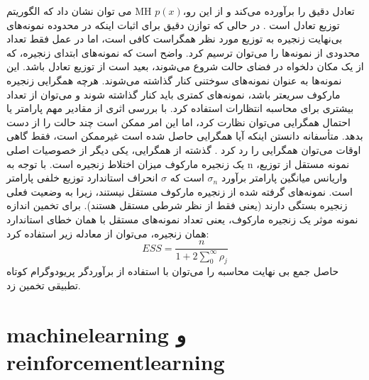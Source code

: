 می توان نشان داد که الگوریتم MH تعادل دقیق را برآورده می‌کند و از این رو،$p(x)$ توزیع تعادل است \cite{bishop2006pattern}. در حالی که توازن دقیق برای اثبات اینکه در محدوده نمونه‌های بی‌نهایت زنجیره به توزیع مورد نظر همگراست کافی است، اما در عمل فقط تعداد محدودی از نمونه‌ها را می‌توان ترسیم کرد. واضح است که نمونه‌های ابتدای زنجیره، که از یک مکان دلخواه در فضای حالت شروع می‌شوند، بعید است از توزیع تعادل باشد. این نمونه‌ها به عنوان نمونه‌های سوختنی کنار گذاشته می‌شوند. هرچه همگرایی زنجیره مارکوف سریعتر باشد، نمونه‌های کمتری باید کنار گذاشته شوند و می‌توان از تعداد بیشتری برای محاسبه انتظارات استفاده کرد. با بررسی اثری از مقادیر مهم پارامتر یا احتمال همگرایی می‌توان نظارت کرد، اما این امر ممکن است چند حالت را از دست بدهد. متأسفانه دانستن اینکه آیا همگرایی حاصل شده است غیرممکن است، فقط گاهی اوقات می‌توان همگرایی را رد کرد \cite{gelman2011inference}. گذشته از همگرایی، یکی دیگر از خصوصیات اصلی یک زنجیره مارکوف میزان اختلاط زنجیره است. با توجه به n نمونه مستقل از توزیع، واریانس میانگین پارامتر برآورد $ \sigma_n $ است که $\sigma$ انحراف استاندارد توزیع خلفی پارامتر است. نمونه‌های گرفته شده از زنجیره مارکوف مستقل نیستند، زیرا به وضعیت فعلی زنجیره بستگی دارند (یعنی فقط از نظر شرطی مستقل هستند). برای تخمین اندازه نمونه موثر یک زنجیره مارکوف، یعنی تعداد نمونه‌های مستقل با همان خطای استاندارد همان زنجیره، می‌توان از معادله زیر استفاده کرد:
\begin{equation}
	E S S=\frac{n}{1+2 \sum_{0}^{\infty} \rho_{j}}
\end{equation}
حاصل جمع بی نهایت محاسبه  را می‌توان با استفاده از برآوردگر پریودوگرام کوتاه تطبیقی  \cite{sokal1997monte} تخمین زد.


\section{\gls{machinelearning} و \gls{reinforcementlearning}}

